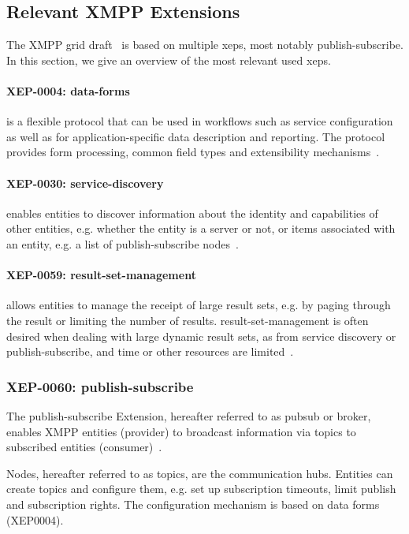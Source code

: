 \subsection{Relevant XMPP Extensions}

The XMPP grid draft~\cite{ietf-mile-xmpp-grid-05} is based on multiple \glspl{xep}, most notably \gls{publish-subscribe}. In this section, we give an overview of the most relevant used \glspl{xep}.

\paragraph{XEP-0004: \gls{data-forms}} is a flexible protocol that can be used in workflows such as service configuration as well as for application-specific data description and reporting. The protocol provides form processing, common field types and extensibility mechanisms~\cite{xep-0004}.

\paragraph{XEP-0030: \gls{service-discovery}} enables entities to discover information about the identity and capabilities of other entities, e.g. whether the entity is a server or not, or items associated with an entity, e.g. a list of \gls{publish-subscribe} nodes~\cite{xep-0030}.

\paragraph{XEP-0059: \Gls{result-set-management}} allows entities to manage the receipt of large result sets, e.g. by paging through the result or limiting the number of results. \gls{result-set-management} is often desired when dealing with large dynamic result sets, as from service discovery or publish-subscribe, and time or other resources are limited~\cite{xep-0059}.

\subsubsection{XEP-0060: \Gls{publish-subscribe}}
The \gls{publish-subscribe} Extension, hereafter referred to as \gls{pubsub} or \gls{broker}, enables XMPP entities (\gls{provider}) to broadcast information via \glspl{topic} to subscribed entities (\gls{consumer})~\cite{xep-0060}.

Nodes, hereafter referred to as \glspl{topic}, are the communication hubs. Entities can create topics and configure them, e.g. set up subscription timeouts, limit publish and subscription rights. The configuration mechanism is based on data forms (XEP0004).

